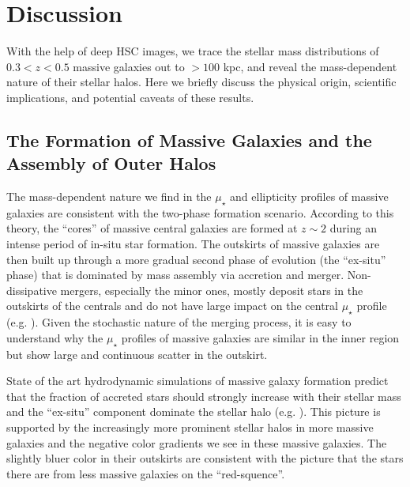 \documentclass[a4paper,fleqn,usenatbib]{mnras}
\def\mden{{$\mu_{\star}$}}
\begin{document}
\section{Discussion}
    \label{sec:discussion}
    
    With the help of deep HSC images, we trace the stellar mass distributions of 
    $0.3 < z < 0.5$ massive galaxies out to $>100$ kpc, and reveal the mass-dependent 
    nature of their stellar halos.
    Here we briefly discuss the physical origin, scientific implications, and potential 
    caveats of these results. 
    

\subsection{The Formation of Massive Galaxies and the Assembly of Outer Halos}
    \label{ssec:twophase}
            
    The mass-dependent nature we find in the \mden{} and ellipticity profiles of 
    massive galaxies are consistent with the two-phase formation scenario. 
    According to this theory, the ``cores'' of massive central galaxies are formed 
    at $z{\sim} 2$ during an intense period of in-situ star formation. 
    The outskirts of massive galaxies are then built up through a more gradual second 
    phase of evolution (the ``ex-situ'' phase) that is dominated by mass assembly via 
    accretion and merger.
    Non-dissipative mergers, especially the minor ones, mostly deposit stars in the 
    outskirts of the centrals and do not have large impact on the central \mden{} 
    profile (e.g. \citealt{Oogi2013, Bedorf2013}).
    Given the stochastic nature of the merging process, it is easy to understand why 
    the \mden{} profiles of massive galaxies are similar in the inner region but show
    large and continuous scatter in the outskirt. 
    
    State of the art hydrodynamic simulations of massive galaxy formation predict 
    that the fraction of accreted stars should strongly increase with their stellar 
    mass and the ``ex-situ'' component dominate the stellar halo (e.g.
    \citealt{Oser2010, Cooper2013, Dubois2013, LeeYi2013, Hirschmann2015,
    RodriguezGomez2016}). 
    This picture is supported by the increasingly more prominent stellar halos in 
    more massive galaxies and the negative color gradients we see in these massive 
    galaxies. 
    The slightly bluer color in their outskirts are consistent with the picture that 
    the stars there are from less massive galaxies on the ``red-squence''. 
    
\end{document}
